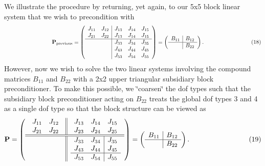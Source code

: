 We illustrate the procedure by returning, yet again, to our 5x5 block linear system that we wish to precondition with \[ \hspace{3cm} {\bf P}_{\rm previous} = \left( \begin{array}{cc|ccc} J_{11} & J_{12} & J_{13} & J_{14} & J_{15} \\ J_{21} & J_{22} & J_{13} & J_{14} & J_{15} \\ \hline & & J_{33} & J_{34} & J_{35} \\ & & J_{43} & J_{44} & J_{45} \\ & & J_{53} & J_{54} & J_{55} \\ \end{array} \right) = \left( \begin{array}{c|c} B_{11} & B_{12}\\ \hline & B_{22} \\ \end{array} \right). \hspace{3cm} (18) \] However, now we wish to solve the two linear systems involving the compound matrices $ B_{11} $ and $ B_{22} $ with a 2x2 upper triangular subsidiary block preconditioner. To make this possible, we \char`\"{}coarsen\char`\"{} the dof types such that the subsidiary block preconditioner acting on $ B_{22}$ treats the global dof types 3 and 4 as a single dof type so that the block structure can be viewed as \[ {\bf P} = \left( \begin{array}{c||c} \begin{array}{cc} J_{11} & J_{12} \\ J_{21} & J_{22} \\ \end{array} & \begin{array}{ccc} J_{13} & J_{14} & J_{15} \\ J_{23} & J_{24} & J_{25} \\ \end{array} \\ \hline \hline & \begin{array}{cc|c} J_{33} & J_{34} & J_{35} \\ J_{43} & J_{44} & J_{45} \\ \hline J_{53} & J_{54} & J_{55} \\ \end{array} \end{array} \right) = \left( \begin{array}{c|c} B_{11} & B_{12}\\ \hline & B_{22} \\ \end{array} \right). \hspace{3cm} (19) \]

